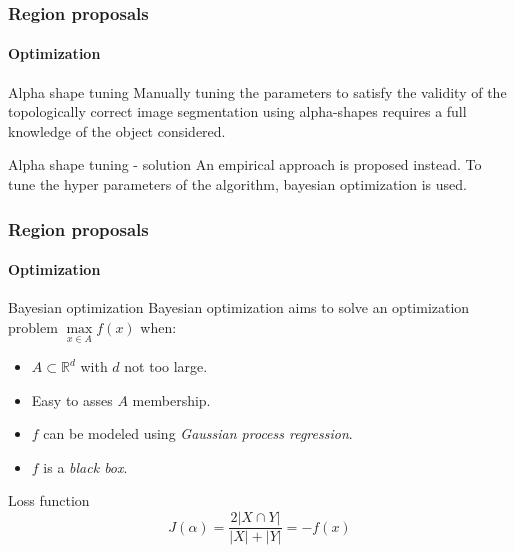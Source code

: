 \begin{frame}
    \frametitle{Region proposals}
    \framesubtitle{Optimization}
    \begin{description}
        \item<1-> 
        \begin{alertblock}{Alpha shape tuning}
            Manually tuning the parameters to satisfy the validity of the topologically correct image segmentation using alpha-shapes requires a full knowledge of the object considered.
        \end{alertblock}
        \item<2->
        \begin{exampleblock}{Alpha shape tuning - solution}
            An empirical approach is proposed instead. To tune the hyper parameters of the algorithm, bayesian optimization is used.
        \end{exampleblock}
    \end{description}
\end{frame}

\begin{frame}
    \frametitle{Region proposals}
    \framesubtitle{Optimization}
    \begin{description}
        \item<1->
        \begin{block}{Bayesian optimization}
            Bayesian optimization aims to solve an optimization problem $\max\limits_{x\in A}f\left(x\right)$ when:
            \begin{itemize}
                \item $A \subset \mathbb{R}^d$ with $d$ not too large.
                \item Easy to asses $A$ membership.
                \item $f$ can be modeled using \emph{Gaussian process regression}.
                \item $f$ is a \emph{black box}.
            \end{itemize}
        \end{block}
        \item<2->
        \begin{exampleblock}{Loss function}
            \begin{equation}
                J\left(\alpha\right) = \frac{2\lvert X \cap Y \rvert}{\lvert X \rvert + \lvert Y \rvert} = -f(x)
            \end{equation}
        \end{exampleblock}
    \end{description}
\end{frame}

